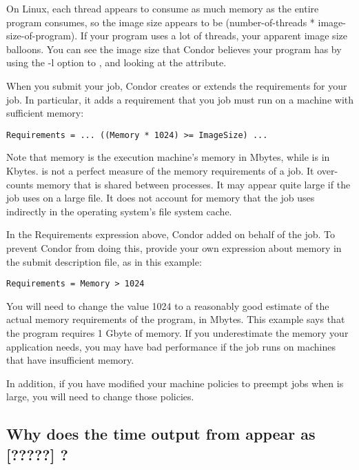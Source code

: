 On Linux, each thread appears to consume as much memory as the entire
program consumes, so the image size appears to be (number-of-threads *
image-size-of-program). If your program uses a lot of threads, your
apparent image size balloons. You can see the image size that Condor
believes your program has by using the -l option to , and
looking at the  attribute.

When you submit your job, Condor creates or extends the requirements
for your job. In particular, it adds a requirement that you job must
run on a machine with sufficient memory:

\footnotesize
\begin{verbatim}
Requirements = ... ((Memory * 1024) >= ImageSize) ...
\end{verbatim}
\normalsize

Note that memory is the execution machine's memory in Mbytes,
while  is in Kbytes.
 is not a perfect measure of the memory requirements of a job.
It over-counts memory that is shared between processes.
It may appear quite large if the job uses  on a large file.
It does not account for memory that the job uses indirectly in the operating
system's file system cache.

In the Requirements expression above, 
Condor added  on behalf of the job.
To prevent Condor from doing this,
provide your own expression about memory in the submit description file,
as in this example:

\begin{verbatim}
Requirements = Memory > 1024
\end{verbatim}

You will need to change the value 1024 to a reasonably good estimate of 
the actual
memory requirements of the program, in Mbytes. This example says that
the program requires 1 Gbyte of memory. If you underestimate the
memory your application needs, you may have bad performance if the job
runs on machines that have insufficient memory.

In addition, if you have modified your machine policies to preempt
jobs when  is large,
you will need to change those policies.

\subsection*{Why does the time output from  appear
as [?????] ? }

